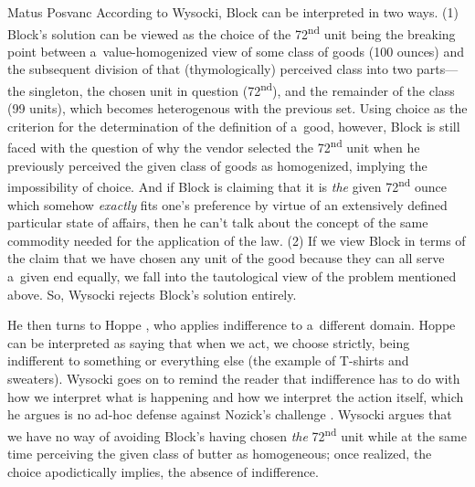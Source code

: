 \begin{artengenv}{Matus Posvanc}
According to Wysocki, Block 
\parencite*[][]{Block1980On} %
 can be interpreted in two ways. (1) Block's solution can be viewed as the choice of the 72\textsuperscript{nd} unit being the breaking point between a~value-homogenized view of some class of goods (100 ounces) and the subsequent division of that (thymologically) perceived class into two parts---the singleton, the chosen unit in question (72\textsuperscript{nd}), and the remainder of the class (99 units), which becomes heterogenous with the previous set. Using choice as the criterion for the determination of the definition of a~good, however, Block is still faced with the question of why the vendor selected the 72\textsuperscript{nd} unit when he previously perceived the given class of goods as homogenized, implying the impossibility of choice. And if Block is claiming that it is \textit{the} given 72\textsuperscript{nd} ounce which somehow \textit{exactly} fits one's preference by virtue of an extensively defined particular state of affairs, then he can't talk about the concept of the same commodity needed for the application of the law. (2) If we view Block in terms of the claim that we have chosen any unit of the good because they can all serve a~given end equally, we fall into the tautological view of the problem mentioned above. So, Wysocki rejects Block's solution entirely.



He then turns to Hoppe 
\parencite*[][]{Hoppe2005Must}, %
 who applies indifference to a~different domain. Hoppe can be interpreted as saying that when we act, we choose strictly, being indifferent to something or everything else (the example of T-shirts and sweaters). Wysocki goes on to remind the reader that indifference has to do with how we interpret what is happening and how we interpret the action itself, which he argues is no ad-hoc defense against Nozick's challenge 
\parencite[][see footnote 27]{Wysocki2021problem}. %
 Wysocki argues that we have no way of avoiding Block's having chosen \textit{the} 72\textsuperscript{nd} unit while at the same time perceiving the given class of butter as homogeneous; once realized, the choice apodictically implies, the absence of indifference.




\end{artengenv}
